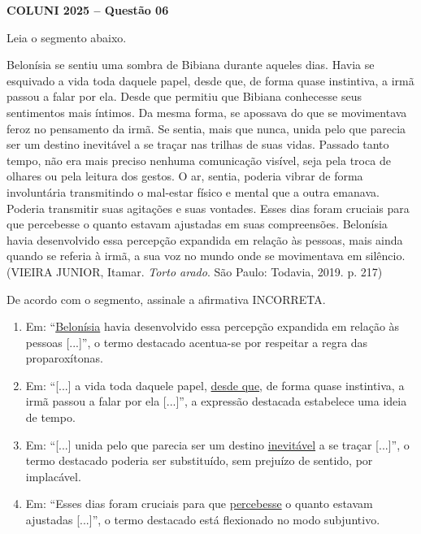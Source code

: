 \textbf{COLUNI 2025 -- Questão 06}\par\medskip Leia o segmento abaixo.

\par

Belonísia se sentiu uma sombra de Bibiana durante aqueles dias. Havia se esquivado a vida toda daquele papel, desde que, de forma quase instintiva, a irmã passou a falar por ela. Desde que permitiu que Bibiana conhecesse seus sentimentos mais íntimos. Da mesma forma, se apossava do que se movimentava feroz no pensamento da irmã. Se sentia, mais que nunca, unida pelo que parecia ser um destino inevitável a se traçar nas trilhas de suas vidas. Passado tanto tempo, não era mais preciso nenhuma comunicação visível, seja pela troca de olhares ou pela leitura dos gestos. O ar, sentia, poderia vibrar de forma involuntária transmitindo o mal-estar físico e mental que a outra emanava. Poderia transmitir suas agitações e suas vontades. Esses dias foram cruciais para que percebesse o quanto estavam ajustadas em suas compreensões. Belonísia havia desenvolvido essa percepção expandida em relação às pessoas, mais ainda quando se referia à irmã, a sua voz no mundo onde se movimentava em silêncio. (VIEIRA JUNIOR, Itamar. \textit{Torto arado}. São Paulo: Todavia, 2019. p. 217)

\par

De acordo com o segmento, assinale a afirmativa INCORRETA.\begin{enumerate}
\item Em: “\underline{Belonísia} havia desenvolvido essa percepção expandida em relação às pessoas [...]”, o termo
       destacado acentua-se por respeitar a regra das proparoxítonas.
\item Em: “[...] a vida toda daquele papel, \underline{desde que}, de forma quase instintiva, a irmã passou a falar por ela
       [...]”, a expressão destacada estabelece uma ideia de tempo.
\item Em: “[...] unida pelo que parecia ser um destino \underline{inevitável} a se traçar [...]”, o termo destacado poderia ser
       substituído, sem prejuízo de sentido, por implacável.
\item Em: “Esses dias foram cruciais para que \underline{percebesse} o quanto estavam ajustadas [...]”, o termo destacado
       está flexionado no modo subjuntivo.\end{enumerate}
